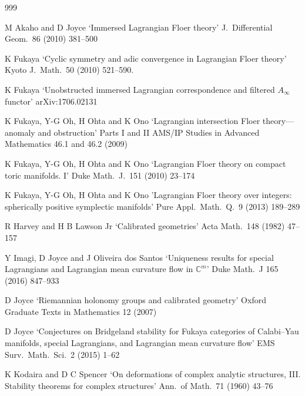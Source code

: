 \documentclass{article}
\theoremstyle{plain}%
\theoremstyle{definition}
\numberwithin{equation}{section}
\numberwithin{figure}{section}
\def\C{{\mathbin{\mathbb C}}}
\def\iy{\infty}
\begin{document}
\begin{thebibliography}{999}


 M Akaho and D Joyce
`Immersed Lagrangian Floer theory' J.\ Differential Geom.\ 86 (2010) 381--500


 K Fukaya
`Cyclic symmetry and adic convergence in Lagrangian Floer theory'
Kyoto J.\ Math.\ 50 (2010) 521--590. 

 K Fukaya
`Unobstructed immersed Lagrangian correspondence and filtered $A_\iy$ functor'
arXiv:1706.02131

 K Fukaya, Y-G Oh, H Ohta and K Ono
`Lagrangian intersection Floer theory---anomaly and obstruction'
Parts I and II AMS/IP Studies in Advanced Mathematics 46.1 and 46.2 (2009)

 K Fukaya, Y-G Oh, H Ohta and K Ono
`Lagrangian Floer theory on compact toric manifolds. I' Duke Math.\ J.\ 151 (2010) 23--174


 K Fukaya, Y-G Oh, H Ohta and K Ono
'Lagrangian Floer theory over integers: spherically positive symplectic manifolds'
Pure Appl.\ Math.\ Q.\
9 (2013) 189--289

 R Harvey and H B Lawson Jr
`Calibrated geometries' Acta Math.\ 148 (1982) 47--157

 Y Imagi, D Joyce and J Oliveira dos Santos
`Uniqueness results for special Lagrangians and Lagrangian mean curvature flow in $\C^m$'
Duke Math.\ J 165 (2016) 847--933

 D Joyce
`Riemannian holonomy groups and calibrated geometry'
Oxford Graduate Texts in Mathematics 12 (2007) 

 D Joyce
`Conjectures on Bridgeland stability for Fukaya categories of Calabi--Yau manifolds, special Lagrangians, and Lagrangian mean curvature flow'
EMS Surv.\ Math.\ Sci.\ 2 (2015) 1--62


 K Kodaira and D C Spencer
`On deformations of complex analytic structures, III. Stability theorems for complex structures'
Ann.\ of Math.\ 71 (1960) 43--76



\end{thebibliography}
\end{document}
